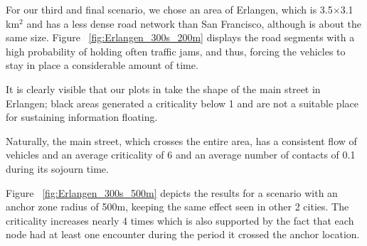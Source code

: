For our third and final scenario, we chose an area of Erlangen, which is
3.5$\times$3.1 km$^2$ and has a less dense road network than San Francisco,
although is about the same size. Figure ~\ref{fig:Erlangen_300s_200m} displays
the road segments with a high probability of holding often traffic jams, and
thus, forcing the vehicles to stay in place a considerable amount of time.

It is clearly visible that our plots in take the shape of the main street in
Erlangen; black areas generated a criticality below 1 and are not a suitable
place for sustaining information floating.

Naturally, the main street, which crosses the entire area, has a consistent flow
of vehicles and an average criticality of 6 and an average number of contacts of
0.1 during its sojourn time.

Figure ~\ref{fig:Erlangen_300s_500m} depicts the results for a scenario with an
anchor zone radius of 500m, keeping the same effect seen in other 2 cities. The
criticality increases nearly 4 times which is also supported by the fact that
each node had at least one encounter during the period it crossed the anchor
location.

